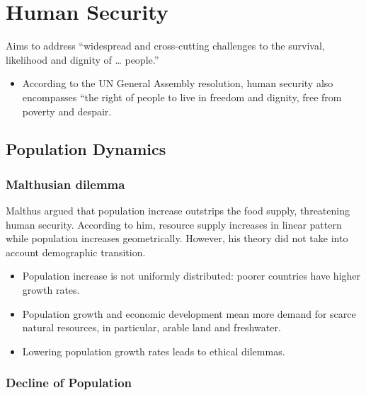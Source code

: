 \documentclass[
]{book}
\providecommand{\tightlist}{%
  \setlength{\itemsep}{0pt}\setlength{\parskip}{0pt}}
\begin{document}
\hypertarget{human-security}{%
\section{Human Security}\label{human-security}}

Aims to address ``widespread and cross-cutting challenges to the survival, likelihood and dignity of \ldots{} people.''

\begin{itemize}
\tightlist
\item
  According to the UN General Assembly resolution, human security also encompasses ``the right of people to live in freedom and dignity, free from poverty and despair.
\end{itemize}

\hypertarget{population-dynamics}{%
\subsection{Population Dynamics}\label{population-dynamics}}

\hypertarget{malthusian-dilemma}{%
\subsubsection{Malthusian dilemma}\label{malthusian-dilemma}}

Malthus argued that population increase outstrips the food supply, threatening human security. According to him, resource supply increases in linear pattern while population increases geometrically. However, his theory did not take into account demographic transition.

\begin{itemize}
\item
  Population increase is not uniformly distributed: poorer countries have higher growth rates.
\item
  Population growth and economic development mean more demand for scarce natural resources, in particular, arable land and freshwater.
\item
  Lowering population growth rates leads to ethical dilemmas.
\end{itemize}

\hypertarget{decline-of-population}{%
\subsubsection{Decline of Population}\label{decline-of-population}}
\end{document}
